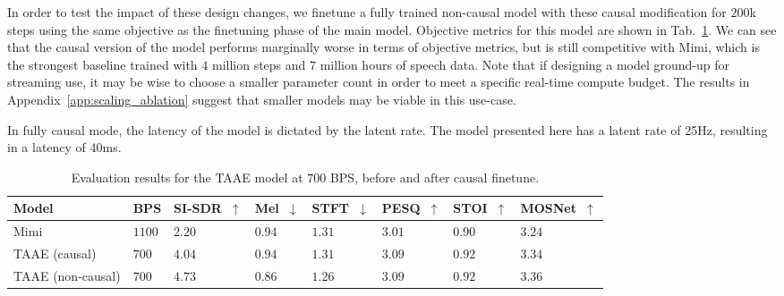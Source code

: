 \documentclass{article} %
\begin{document}
In order to test the impact of these design changes, we finetune a fully trained non-causal model with these causal modification for $200$k steps using the same objective as the finetuning phase of the main model. Objective metrics for this model are shown in Tab.~\ref{tab:taae_causal}. We can see that the causal version of the model performs marginally worse in terms of objective metrics, but is still competitive with Mimi, which is the strongest baseline trained with $4$ million steps and $7$ million hours of speech data. Note that if designing a model ground-up for streaming use, it may be wise to choose a smaller parameter count in order to meet a specific real-time compute budget. The results in Appendix~\ref{app:scaling_ablation} suggest that smaller models may be viable in this use-case.

In fully causal mode, the latency of the model is dictated by the latent rate. The model presented here has a latent rate of 25\si{\Hz}, resulting in a latency of 40\si{\milli\second}.

\begin{table}[h]
\centering
\scriptsize
\begin{tabularx}{0.9\textwidth}{
    >{\raggedright\arraybackslash}m{2cm} %
    >{\centering\arraybackslash}X %
    >{\centering\arraybackslash}X %
    >{\centering\arraybackslash}X %
    >{\centering\arraybackslash}X %
    >{\centering\arraybackslash}X %
    >{\centering\arraybackslash}X %
    >{\centering\arraybackslash}X %
}
\toprule
\textbf{Model} & \textbf{BPS} & \textbf{SI-SDR~$\uparrow$} & \textbf{Mel~$\downarrow$} & \textbf{STFT~$\downarrow$} & \textbf{PESQ~$\uparrow$} & \textbf{STOI~$\uparrow$} & \textbf{MOSNet~$\uparrow$} \\
\midrule
Mimi & $1100$ & $2.20$ & $0.94$ & $1.31$ & $3.01$ & $0.90$ & $3.24$ \\ 
TAAE (causal) & $700$  & $4.04$ & $0.94$ & $1.31$ & $3.09$ & $0.92$ & $3.34$\\
TAAE (non-causal) & $700$ & $4.73$ & $0.86$ & $1.26$ & $3.09$ & $0.92$ & $3.36$ \\
\bottomrule
\end{tabularx}
\caption{Evaluation results for the TAAE model at $700$ BPS, before and after causal finetune.}
\label{tab:taae_causal}
\end{table}
\end{document}
